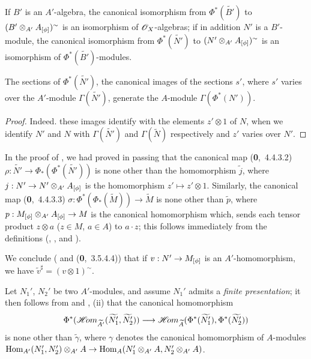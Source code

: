If $B'$ is an $A'$-algebra, the canonical isomorphism from $\Phi^*(\widetilde{B'})$ to
$(B'\otimes_{A'}A_{[\phi]})^\sim$ is an isomorphism of $\mathscr{O}_X$-algebras; if in addition $N'$
is a $B'$-module, the canonical isomorphism from $\Phi^*(\widetilde{N'})$ to
$(N'\otimes_{A'}A_{[\phi]})^\sim$ is an isomorphism of $\Phi^*(\widetilde{B'})$-modules.

\begin{cor}[1.6.6]
\label{1.1.6.6}
The sections of $\Phi^*(\widetilde{N'})$, the canonical images of the sections $s'$, where
$s'$ varies over the $A'$-module $\Gamma(\widetilde{N'})$, generate the $A$-module
$\Gamma(\Phi^*(N'))$.
\end{cor}

\begin{proof}
\label{proof-1.1.6.6}
Indeed. these images identify with the elements $z'\otimes 1$ of $N$, when we identify $N'$
and $N$ with $\Gamma(\widetilde{N'})$ and $\Gamma(\widetilde{N})$ respectively
 and $z'$ varies over $N'$.
\end{proof}

\begin{env}[1.6.7]
\label{1.1.6.7}
In the proof of , we had proved in passing that the canonical map
(\textbf{0},~4.4.3.2) $\rho:\widetilde{N'}\to\Phi_*(\Phi^*(\widetilde{N'}))$ is none other
than the homomorphism $\widetilde{j}$,
where $j:N'\to N'\otimes_{A'}A_{[\phi]}$ is the homomorphism $z'\mapsto z'\otimes 1$.
Similarly, the canonical map (\textbf{0},~4.4.3.3)
$\sigma:\Phi^*(\Phi_*(\widetilde{M}))\to\widetilde{M}$ is none other than $\widetilde{p}$,
where $p:M_{[\phi]}\otimes_{A'}A_{[\phi]}\to M$ is the canonical homomorphism which, sends
each tensor product $z\otimes a$ ($z\in M$, $a\in A$) to $a\cdot z$; this follows immediately
from the definitions (, ,
and ).

We conclude ( and (\textbf{0},~3.5.4.4)) that if $v:N'\to M_{[\phi]}$ is an
$A'$-homomorphism, we have $\widetilde{v}^\sharp=(v\otimes 1)^\sim$.
\end{env}

\begin{env}[1.6.8]
\label{1.1.6.8}
Let $N_1'$, $N_2'$ be two $A'$-modules, and assume $N_1'$ admits a {\em finite
presentation}; it then follows from  and , (ii) that the
canonical homomorphism 
\[
  \Phi^*(\mathscr{H}\!{om}_{\widetilde{A'}}(\widetilde{N_1'},\widetilde{N_2'}))
  \longrightarrow\mathscr{H}\!{om}_{\widetilde{A}}(\Phi^*(\widetilde{N_1'}),\Phi^*(\widetilde{N_2'}))
\]
is none other than $\widetilde{\gamma}$, where $\gamma$ denotes the canonical homomorphism
of $A$-modules
${\mathop{\mathrm{Hom}}\nolimits}_{A'}(N_1',N_2')\otimes_{A'}A\to{\mathop{\mathrm{Hom}}\nolimits}_A(N_1'\otimes_{A'}A,N_2'\otimes_{A'}A)$.
\end{env}

